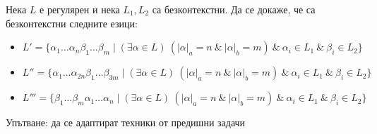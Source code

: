 \begin{problem}
Нека $L$ е регулярен и нека $L_1, L_2$ са безконтекстни.
Да се докаже, че са безконтекстни следните езици:
\begin{itemize}
    \item $L' = \{ \alpha_1 \dots \alpha_n \beta_1 \dots \beta_m \mid (\exists \alpha \in L) \: (|\alpha|_a = n \: \& \: |\alpha|_b = m) \: \& \: \alpha_i \in L_1 \: \& \: \beta_i \in L_2 \}$
    \item $L'' = \{ \alpha_1 \dots \alpha_{2n} \beta_1 \dots \beta_{3m} \mid (\exists \alpha \in L) \: (|\alpha|_a = n \: \& \: |\alpha|_b = m) \: \& \: \alpha_i \in L_1 \: \& \: \beta_i \in L_2 \}$
    \item $L''' = \{ \beta_1 \dots \beta_m \alpha_1 \dots \alpha_n \mid (\exists \alpha \in L) \: (|\alpha|_a = n \: \& \: |\alpha|_b = m) \: \& \: \alpha_i \in L_1 \: \& \: \beta_i \in L_2 \}$
\end{itemize}
Упътване: да се адаптират техники от предишни задачи
\end{problem}